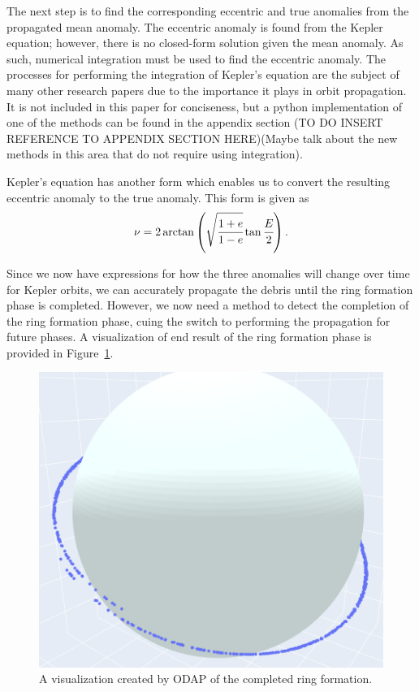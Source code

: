 \documentclass[a4paper, 12pt]{article}
\begin{document}
The next step is to find the corresponding eccentric and true anomalies from the propagated mean anomaly. The eccentric anomaly is found from the Kepler equation; however, there is no closed-form solution given the mean anomaly. As such, numerical integration must be used to find the eccentric anomaly. The processes for performing the integration of Kepler's equation are the subject of many other research papers due to the importance it plays in orbit propagation. It is not included in this paper for conciseness, but a python implementation of one of the methods can be found in the appendix section (TO DO INSERT REFERENCE TO APPENDIX SECTION HERE)(Maybe talk about the new methods in this area that do not require using integration).

Kepler's equation has another form which enables us to convert the resulting eccentric anomaly to the true anomaly. This form is given as
\begin{equation}
	\nu = 2 \arctan\left(\sqrt{\cfrac{1+e}{1-e}}\tan\cfrac{E}{2}\right).
\end{equation}

Since we now have expressions for how the three anomalies will change over time for Kepler orbits, we can accurately propagate the debris until the ring formation phase is completed. However, we now need a method to detect the completion of the ring formation phase, cuing the switch to performing the propagation for future phases. A visualization of end result of the ring formation phase is provided in Figure~\ref{ring}.
\begin{figure}[b!]
	\centering
	\includegraphics[scale=0.45]{ring_phase}
	\caption{A visualization created by ODAP of the completed ring formation.}
	\label{ring}
\end{figure}
\end{document}
